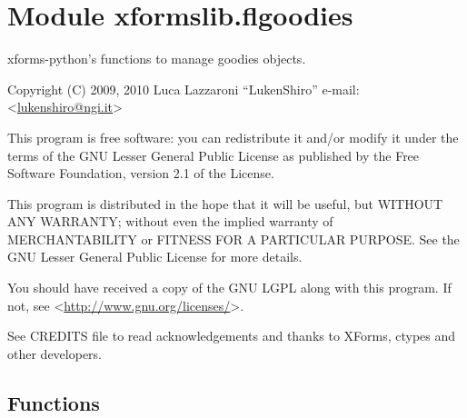 %
%
%


\section{Module xformslib.flgoodies}

    \label{xformslib:flgoodies}

xforms-python's functions to manage goodies objects.

Copyright (C) 2009, 2010  Luca Lazzaroni ``LukenShiro''
e-mail: <\href{mailto:lukenshiro@ngi.it}{lukenshiro@ngi.it}>

This program is free software: you can redistribute it and/or modify
it under the terms of the GNU Lesser General Public License as
published by the Free Software Foundation, version 2.1 of the License.

This program is distributed in the hope that it will be useful,
but WITHOUT ANY WARRANTY; without even the implied warranty of
MERCHANTABILITY or FITNESS FOR A PARTICULAR PURPOSE. See the
GNU Lesser General Public License for more details.

You should have received a copy of the GNU LGPL along with this
program. If not, see <\href{http://www.gnu.org/licenses/}{http://www.gnu.org/licenses/}>.

See CREDITS file to read acknowledgements and thanks to XForms,
ctypes and other developers.


  \subsection{Functions}

    \label{xformslib:flgoodies:fl_set_goodies_font}

